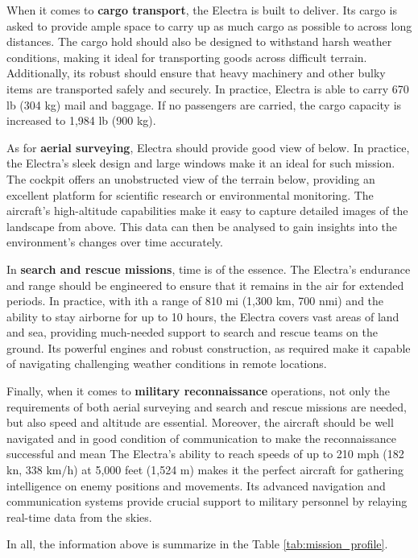 When it comes to \textbf{cargo transport}, the Electra is built to deliver. Its  cargo is asked to provide ample space to carry up as much cargo as possible to across long distances. The cargo hold should also be designed to withstand harsh weather conditions, making it ideal for transporting goods across difficult terrain. Additionally, its robust should ensure that heavy machinery and other bulky items are transported safely and securely. In practice, Electra is able to carry 670 lb (304 kg) mail and baggage. If no passengers are carried, the cargo capacity is increased to 1,984 lb (900 kg).

As for \textbf{aerial surveying}, Electra should provide good view of below. In practice, the Electra's sleek design and large windows make it an ideal for such mission. The cockpit offers an unobstructed view of the terrain below, providing an excellent platform for scientific research or environmental monitoring. The aircraft's high-altitude capabilities make it easy to capture detailed images of the landscape from above. This data can then be analysed to gain insights into the environment's changes over time accurately.

In \textbf{search and rescue missions}, time is of the essence. The Electra's endurance and range should be engineered to ensure that it remains in the air for extended periods. In practice, with ith a range of 810 mi (1,300 km, 700 nmi) and the ability to stay airborne for up to 10 hours, the Electra covers vast areas of land and sea, providing much-needed support to search and rescue teams on the ground. Its powerful engines and robust construction, as required make it capable of navigating challenging weather conditions in remote locations.

Finally, when it comes to \textbf{military reconnaissance} operations, not only the requirements of both aerial surveying and search and rescue missions are needed, but also speed and altitude are essential. Moreover, the aircraft should be well navigated and in good condition of communication to make the reconnaissance successful and mean The Electra's ability to reach speeds of up to 210 mph (182 kn, 338 km/h) at 5,000 feet (1,524 m) makes it the perfect aircraft for gathering intelligence on enemy positions and movements. Its advanced navigation and communication systems provide crucial support to military personnel by relaying real-time data from the skies.

In all, the information above is summarize in the Table \ref{tab:mission_profile}.

